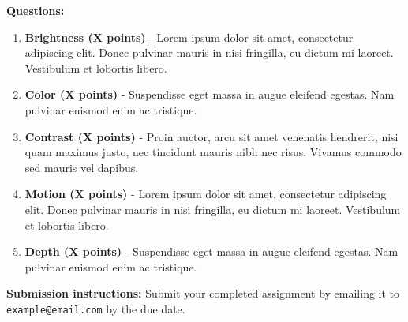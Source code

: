 \documentclass{article}
\begin{document}
\noindent \textbf{Questions:}

\begin{enumerate}[label=\textbf{\arabic*.}]
	\item \textbf{Brightness (X points)} - Lorem ipsum dolor sit amet, consectetur adipiscing elit. Donec pulvinar mauris in nisi fringilla, eu dictum mi laoreet. Vestibulum et lobortis libero.
	\item \textbf{Color (X points)} - Suspendisse eget massa in augue eleifend egestas. Nam pulvinar euismod enim ac tristique.
	\item \textbf{Contrast (X points)} - Proin auctor, arcu sit amet venenatis hendrerit, nisi quam maximus justo, nec tincidunt mauris nibh nec risus. Vivamus commodo sed mauris vel dapibus.
	\item \textbf{Motion (X points)} - Lorem ipsum dolor sit amet, consectetur adipiscing elit. Donec pulvinar mauris in nisi fringilla, eu dictum mi laoreet. Vestibulum et lobortis libero.
	\item \textbf{Depth (X points)} - Suspendisse eget massa in augue eleifend egestas. Nam pulvinar euismod enim ac tristique.
\end{enumerate}

\noindent \textbf{Submission instructions:} Submit your completed assignment by emailing it to \texttt{example@email.com} by the due date.
\end{document}
